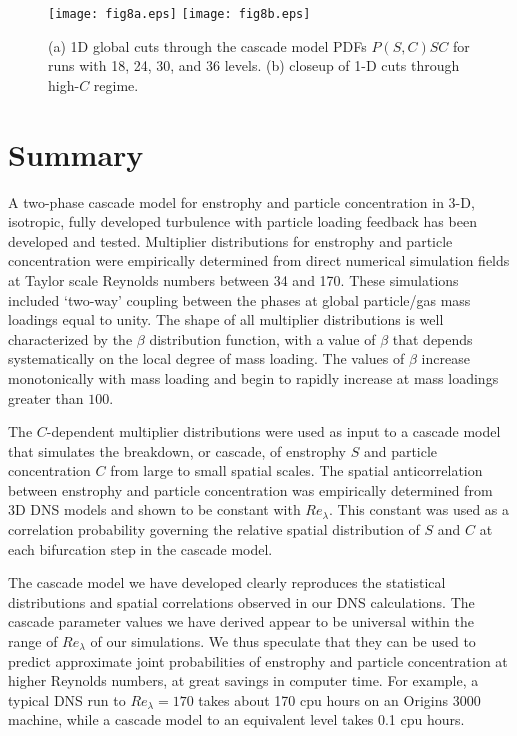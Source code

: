 \documentclass[aps,pra,twocolumn,groupedaddress,showkeys,showpacs,floatfix]{revtex4}
\begin{document}
\begin{figure}[h]
\begin{center}
\texttt{[image: fig8a.eps]}
\texttt{[image: fig8b.eps]}
\caption{\label{fig8}(a) 1D global cuts through the cascade model PDFs $P(S,C)SC$ for 
runs with 18, 24, 30, and 36 levels. (b) closeup of 1-D cuts through high-$C$ regime. } 
\end{center}
\end{figure}

\section {Summary}

A two-phase cascade model for enstrophy and particle concentration in 3-D,
isotropic, fully developed turbulence with particle loading feedback
has been developed and tested. Multiplier
distributions for enstrophy and particle concentration were empirically
determined from direct numerical simulation fields at Taylor scale Reynolds
numbers between 34 and 170. These simulations included `two-way' coupling
between the phases at global particle/gas mass loadings equal to unity. The
shape of all multiplier distributions is well characterized by the $\beta$
distribution function, with a value of $\beta$ that depends systematically on
the local degree of mass loading. The values of $\beta$ increase monotonically
with mass loading and begin to rapidly increase at mass loadings greater
than $100$.

The $C$-dependent multiplier distributions were used as input to a cascade
model that simulates the breakdown, or cascade, of enstrophy $S$ and particle
concentration $C$ from large to small spatial scales. The spatial
anticorrelation between enstrophy and particle concentration was empirically
determined from 3D DNS models and shown to be constant with $Re_{\lambda}$.
This constant was used as a correlation probability governing the relative
spatial distribution of $S$ and $C$ at each bifurcation step in the cascade
model.

The cascade model we have developed clearly reproduces the statistical
distributions and spatial correlations observed in our DNS calculations.  The
cascade parameter values we have derived appear to be universal within the
range of  $Re_{\lambda}$  of our simulations. 
We thus speculate that they
can be used to predict approximate joint probabilities of enstrophy and particle
concentration at higher Reynolds numbers, at great savings in computer time.
For example, a typical DNS run to $Re_{\lambda} = 170$ takes about 170 cpu
hours on an Origins 3000 machine, while a cascade model to an equivalent level
takes 0.1 cpu hours. 
\end{document}

